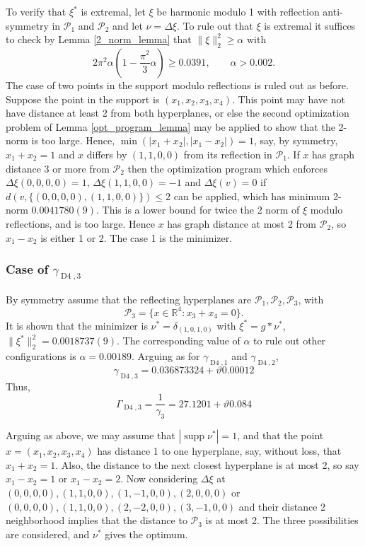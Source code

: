 \documentclass[a4paper, 12pt, notitlepage]{amsart}
\newcommand{\Dfour}{\operatorname{D4}}
\newcommand{\supp}{\operatorname{supp}}
\newcommand{\bR}{\mathbb{R}}
\newcommand{\sP}{{\mathscr{P}}}
\theoremstyle{remark}
\begin{document}
To verify that $\xi^*$ is extremal, let $\xi$ be harmonic modulo 1 with reflection anti-symmetry in $\sP_1$ and $\sP_2$ and let $\nu = \Delta \xi$.  To rule out that $\xi$ is extremal it suffices to check by Lemma \ref{2_norm_lemma} that $\|\xi\|_2^2 \geq \alpha$ with 
\begin{equation}
 2\pi^2 \alpha\left(1 - \frac{\pi^2}{3}\alpha \right) \geq 0.0391, \qquad \alpha >0.002. 
\end{equation}
The case of two points in the support modulo reflections is ruled out as before.  Suppose the point in the support is $(x_1, x_2, x_3, x_4)$.  This point may have not have distance at least 2 from both hyperplanes, or else the second optimization problem of Lemma \ref{opt_program_lemma} may be applied to show that the 2-norm is too large.  Hence, $\min(|x_1 + x_2|, |x_1 -x_2|) = 1$, say, by symmetry, $x_1 + x_2 = 1$ and $x$ differs by $(1,1,0,0)$ from its reflection in $\sP_1$.  If $x$ has graph distance 3 or more from $\sP_2$ then the  optimization program which enforces $\Delta \xi (0,0,0,0)= 1$, $\Delta \xi (1,1,0,0) = -1$ and $\Delta \xi(v) = 0$ if $d(v, \{(0,0,0,0), (1,1,0,0)\}) \leq 2$ can be applied, which has minimum 2-norm  $0.0041780(9)$.  This is a lower bound for twice the 2 norm of $\xi$ modulo reflections, and is too large.  Hence $x$ has graph distance at most 2 from $\sP_2$, so $x_1 - x_2$ is either 1 or 2.  The case 1 is the minimizer. 

\subsubsection*{Case of $\gamma_{\Dfour, 3}$}  By symmetry assume that the reflecting hyperplanes are $\sP_1, \sP_2, \sP_3$, with
\begin{equation}
 \sP_3 = \{x \in \bR^4: x_3 + x_4 = 0\}.
\end{equation}
It is shown that the minimizer is $\nu^* = \delta_{(1,0,1,0)}$ with $\xi^* = g*\nu^*$, $\|\xi^*\|_2^2 = 0.0018737(9)$. The corresponding value of $\alpha$ to rule out other configurations is $\alpha = 0.00189$.  Arguing as for $\gamma_{\Dfour, 1}$ and $\gamma_{\Dfour, 2}$,
\begin{equation*}
 \gamma_{\Dfour,3} = 0.036873324 +\vartheta 0.00012
\end{equation*}
Thus,
\begin{equation*}
 \Gamma_{\Dfour,3} = \frac{1}{\gamma_3} = 27.1201 + \vartheta 0.084
\end{equation*}

Arguing as above, we may assume that $|\supp \nu^*| = 1$, and that the point $x = (x_1, x_2, x_3, x_4)$ has distance 1 to one hyperplane, say, without loss, that $x_1 + x_2 = 1$.  Also, the distance to the next closest hyperplane is at most 2, so say $x_1 - x_2 = 1$ or $x_1 - x_2 = 2$.  Now considering $\Delta \xi$ at $(0,0,0,0), (1,1,0,0), (1,-1,0,0), (2,0,0,0)$ or $(0,0,0,0), (1,1,0,0), (2,-2,0,0), (3,-1,0,0)$ and their distance 2 neighborhood implies that the distance to $\sP_3$ is at most 2.  The three possibilities are considered, and $\nu^*$ gives the optimum. 
\end{document}
